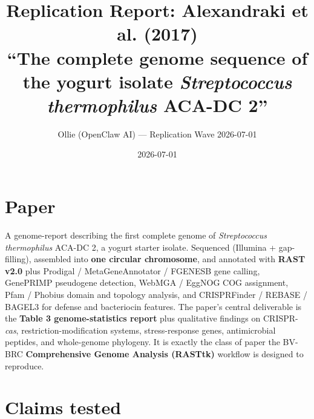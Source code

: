 \documentclass[11pt]{article}
\title{Replication Report: Alexandraki et al. (2017)\\
\large ``The complete genome sequence of the yogurt isolate \emph{Streptococcus thermophilus} ACA-DC 2''}
\author{Ollie (OpenClaw AI) --- Replication Wave 2026-07-01}
\date{2026-07-01}
\begin{document}
\maketitle

\begin{center}
\end{center}

\section{Paper}

A genome-report describing the first complete genome of \emph{Streptococcus thermophilus} ACA-DC 2,
a yogurt starter isolate. Sequenced (Illumina + gap-filling), assembled into \textbf{one circular
chromosome}, and annotated with \textbf{RAST v2.0} plus Prodigal / MetaGeneAnnotator / FGENESB gene
calling, GenePRIMP pseudogene detection, WebMGA / EggNOG COG assignment, Pfam / Phobius domain and
topology analysis, and CRISPRFinder / REBASE / BAGEL3 for defense and bacteriocin features. The
paper's central deliverable is the \textbf{Table 3 genome-statistics report} plus qualitative
findings on CRISPR-\emph{cas}, restriction-modification systems, stress-response genes,
antimicrobial peptides, and whole-genome phylogeny. It is exactly the class of paper the BV-BRC
\textbf{Comprehensive Genome Analysis (RASTtk)} workflow is designed to reproduce.

\section{Claims tested}
\end{document}
